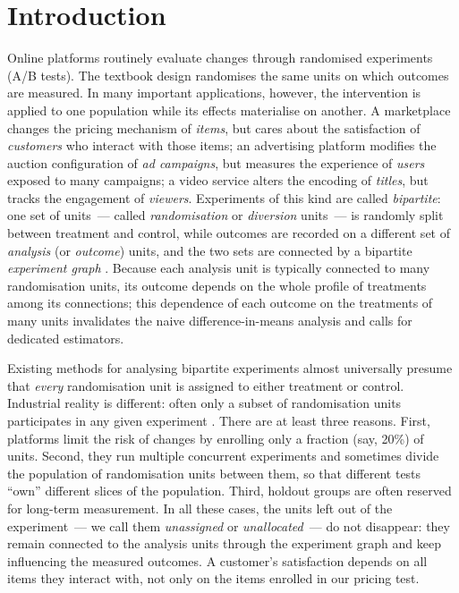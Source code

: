 \documentclass[sigconf]{acmart}
\begin{document}

\maketitle

\section{Introduction}\label{sec:introduction}

Online platforms routinely evaluate changes through randomised experiments (A/B tests). The textbook design randomises the same units on which outcomes are measured. In many important applications, however, the intervention is applied to one population while its effects materialise on another. A marketplace changes the pricing mechanism of \emph{items}, but cares about the satisfaction of \emph{customers} who interact with those items; an advertising platform modifies the auction configuration of \emph{ad campaigns}, but measures the experience of \emph{users} exposed to many campaigns; a video service alters the encoding of \emph{titles}, but tracks the engagement of \emph{viewers}. Experiments of this kind are called \emph{bipartite}: one set of units~--- called \emph{randomisation} or \emph{diversion} units~--- is randomly split between treatment and control, while outcomes are recorded on a different set of \emph{analysis} (or \emph{outcome}) units, and the two sets are connected by a bipartite \emph{experiment graph} \cite{zigler2021bipartite,harshaw2023erl,doudchenko2020causal}. Because each analysis unit is typically connected to many randomisation units, its outcome depends on the whole profile of treatments among its connections; this dependence of each outcome on the treatments of many units invalidates the naive difference-in-means analysis and calls for dedicated estimators.

Existing methods for analysing bipartite experiments almost universally presume that \emph{every} randomisation unit is assigned to either treatment or control. Industrial reality is different: often only a subset of randomisation units participates in any given experiment \cite{kohavi2020trustworthy,tang2010overlapping}. There are at least three reasons. First, platforms limit the risk of changes by enrolling only a fraction (say, 20\%) of units. Second, they run multiple concurrent experiments and sometimes divide the population of randomisation units between them, so that different tests ``own'' different slices of the population. Third, holdout groups are often reserved for long-term measurement. In all these cases, the units left out of the experiment~--- we call them \emph{unassigned} or \emph{unallocated}~--- do not disappear: they remain connected to the analysis units through the experiment graph and keep influencing the measured outcomes. A customer's satisfaction depends on all items they interact with, not only on the items enrolled in our pricing test.
\end{document}

